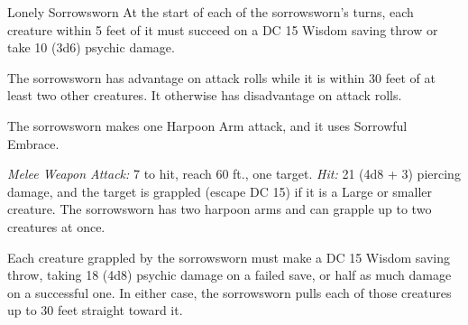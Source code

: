 \documentclass[10pt,a4paper,twoside,bg=print,twocolumn,openany,nodeprecatedcode]{dndbook}
\begin{document}
\begin{DndMonster}[float=t]{Lonely Sorrowsworn}
\DndMonsterBasics[
armor-class = {16 (natural armor)},
hit-points = {\DndDice{15d8 + 45}},
speed = {30 ft.}
]
\DndMonsterAbilityScores[
 str = 16,
 dex = 12,
 con = 17,
 int = 6,
 wis = 11,
 cha = 6
]
\DndMonsterDetails[
damage-resistances = {bludgeoning, piercing, slashing while in dim light or darkness},
senses = {darkvision 60 ft., passive perception 10},
languages = {Common},
challenge = 9,
]
At the start of each of the sorrowsworn's turns, each creature within 5 feet of it must succeed on a DC 15 Wisdom saving throw or take 10 (3d6) psychic damage.

The sorrowsworn has advantage on attack rolls while it is within 30 feet of at least two other creatures. It otherwise has disadvantage on attack rolls.

The sorrowsworn makes one Harpoon Arm attack, and it uses Sorrowful Embrace.

\textsl{Melee Weapon Attack:} 7 to hit, reach 60 ft., one target. \textsl{Hit:} 21 (4d8 + 3) piercing damage, and the target is grappled (escape DC 15) if it is a Large or smaller creature. The sorrowsworn has two harpoon arms and can grapple up to two creatures at once.

Each creature grappled by the sorrowsworn must make a DC 15 Wisdom saving throw, taking 18 (4d8) psychic damage on a failed save, or half as much damage on a successful one. In either case, the sorrowsworn pulls each of those creatures up to 30 feet straight toward it.

\end{DndMonster}
\end{document}
